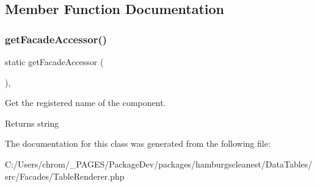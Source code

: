\subsection{Member Function Documentation}
\mbox{\label{classhamburgscleanest_1_1_data_tables_1_1_facades_1_1_table_renderer_a19a808201f41f32f71a0532cb49b450f}} 
\subsubsection{\texorpdfstring{get\+Facade\+Accessor()}{getFacadeAccessor()}}
{\footnotesize\ttfamily static get\+Facade\+Accessor (\begin{DoxyParamCaption}{ }\end{DoxyParamCaption})\hspace{0.3cm}{\ttfamily [static]}, {\ttfamily [protected]}}

Get the registered name of the component.

\begin{DoxyReturn}{Returns}
string 
\end{DoxyReturn}


The documentation for this class was generated from the following file\+:\begin{DoxyCompactItemize}
\item 
C\+:/\+Users/chrom/\+\_\+\+P\+A\+G\+E\+S/\+Package\+Dev/packages/hamburgscleanest/\+Data\+Tables/src/\+Facades/Table\+Renderer.\+php\end{DoxyCompactItemize}
